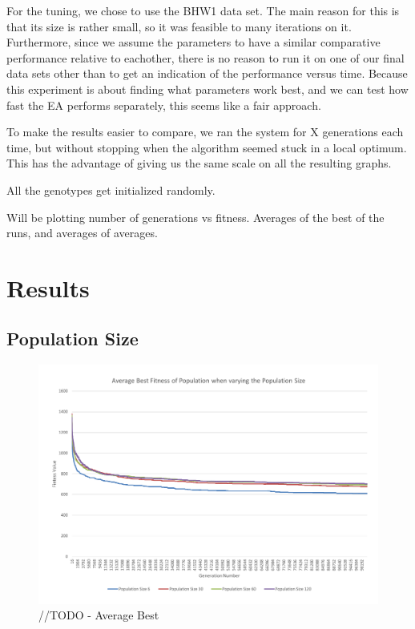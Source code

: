 For the tuning, we chose to use the BHW1 data set. The main reason for this is that its size is rather small, so it was feasible to many iterations on it. Furthermore, since we assume the parameters to have a similar comparative performance relative to eachother, there is no reason to run it on one of our final data sets other than to get an indication of the performance versus time. Because this experiment is about finding what parameters work best, and we can test how fast the EA performs separately, this seems like a fair approach.

To make the results easier to compare, we ran the system for X generations each time, but without stopping when the algorithm seemed stuck in a local optimum. This has the advantage of giving us the same scale on all the resulting graphs.

All the genotypes get initialized randomly.

Will be plotting number of generations vs fitness. Averages of the best of the runs, and averages of averages. 

\section{Results} %
\label{sec:results}

\subsection{Population Size}
\label{sub:population_size)}

\begin{figure}
	\centerline{\includegraphics[width=\paperwidth]{figures/CircleTests/CircleTestsPopulationAverageBest.pdf}}
	\caption{//TODO - Average Best}
\end{figure}

